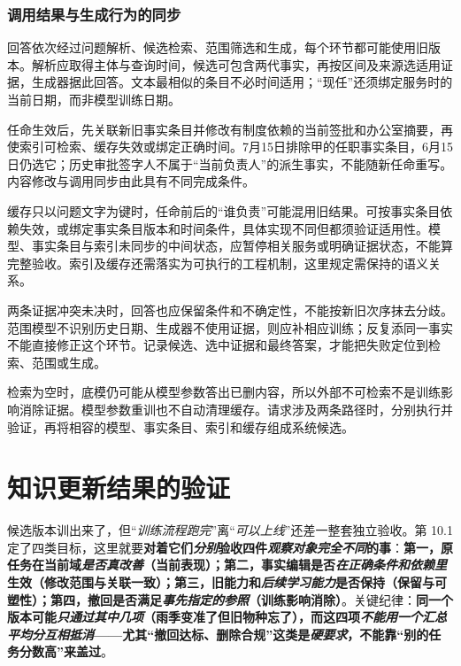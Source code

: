 \subsubsection{调用结果与生成行为的同步}
\label{sec:ket-update-sync}

回答依次经过问题解析、候选检索、范围筛选和生成，每个环节都可能使用旧版本。解析应取得主体与查询时间，候选可包含两代事实，再按区间及来源选适用证据，生成器据此回答。文本最相似的条目不必时间适用；“现任”还须绑定服务时的当前日期，而非模型训练日期。

任命生效后，先关联新旧事实条目并修改有制度依赖的当前签批和办公室摘要，再使索引可检索、缓存失效或绑定正确时间。7月15日排除甲的任职事实条目，6月15日仍选它；历史审批签字人不属于“当前负责人”的派生事实，不能随新任命重写。内容修改与调用同步由此具有不同完成条件。

缓存只以问题文字为键时，任命前后的“谁负责”可能混用旧结果。可按事实条目依赖失效，或绑定事实条目版本和时间条件，具体实现不同但都须验证适用性。模型、事实条目与索引未同步的中间状态，应暂停相关服务或明确证据状态，不能算完整验收。索引及缓存还需落实为可执行的工程机制，这里规定需保持的语义关系。

两条证据冲突未决时，回答也应保留条件和不确定性，不能按新旧次序抹去分歧。范围模型不识别历史日期、生成器不使用证据，则应补相应训练；反复添同一事实不能直接修正这个环节。记录候选、选中证据和最终答案，才能把失败定位到检索、范围或生成。

检索为空时，底模仍可能从模型参数答出已删内容，所以外部不可检索不是训练影响消除证据。模型参数重训也不自动清理缓存。请求涉及两条路径时，分别执行并验证，再将相容的模型、事实条目、索引和缓存组成系统候选。

\section{知识更新结果的验证}
\label{sec:ket-update-validation}

候选版本训出来了，但“\emph{训练流程跑完}”离“\emph{可以上线}”还差一整套独立验收。第 10.1 定了四类目标，这里就要\textbf{对着它们\emph{分别}验收四件\emph{观察对象完全不同}的事}：\textbf{第一，原任务在当前域\emph{是否真改善}（当前表现）；第二，事实编辑是否\emph{在正确条件和依赖里}生效（修改范围与关联一致）；第三，旧能力和\emph{后续学习能力}是否保持（保留与可塑性）；第四，撤回是否满足\emph{事先指定的参照}（训练影响消除）}。关键纪律：\textbf{同一个版本可能\emph{只通过其中几项}（雨季变准了但旧物种忘了），而这四项\emph{不能用一个汇总平均分\emph{互相抵消}}——尤其“撤回达标、删除合规”这类是\emph{硬要求}，不能靠“别的任务分数高”来盖过}。

